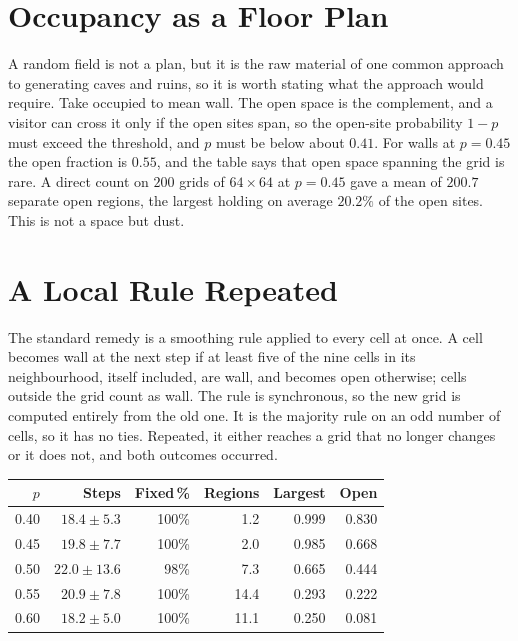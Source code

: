 \section{Occupancy as a Floor Plan}

A random field is not a plan, but it is the raw material of one common approach to generating caves and ruins, so it is worth stating what the approach would require. Take occupied to mean wall. The open space is the complement, and a visitor can cross it only if the open sites span, so the open-site probability $1-p$ must exceed the threshold, and $p$ must be below about $0.41$. For walls at $p=0.45$ the open fraction is $0.55$, and the table says that open space spanning the grid is rare. A direct count on $200$ grids of $64\times 64$ at $p=0.45$ gave a mean of $200.7$ separate open regions, the largest holding on average $20.2\%$ of the open sites. This is not a space but dust.

\section{A Local Rule Repeated}

The standard remedy is a smoothing rule applied to every cell at once. A cell becomes wall at the next step if at least five of the nine cells in its neighbourhood, itself included, are wall, and becomes open otherwise; cells outside the grid count as wall. The rule is synchronous, so the new grid is computed entirely from the old one. It is the majority rule on an odd number of cells, so it has no ties. Repeated, it either reaches a grid that no longer changes or it does not, and both outcomes occurred.

\begin{center}
\begin{tabular}{rrrrrr}
\toprule
$p$ & Steps & Fixed\,\% & Regions & Largest & Open\\
\midrule
0.40 & $18.4\pm 5.3$ & 100\% & 1.2 & 0.999 & 0.830\\
0.45 & $19.8\pm 7.7$ & 100\% & 2.0 & 0.985 & 0.668\\
0.50 & $22.0\pm13.6$ & 98\%  & 7.3 & 0.665 & 0.444\\
0.55 & $20.9\pm 7.8$ & 100\% & 14.4 & 0.293 & 0.222\\
0.60 & $18.2\pm 5.0$ & 100\% & 11.1 & 0.250 & 0.081\\
\bottomrule
\end{tabular}
\end{center}

